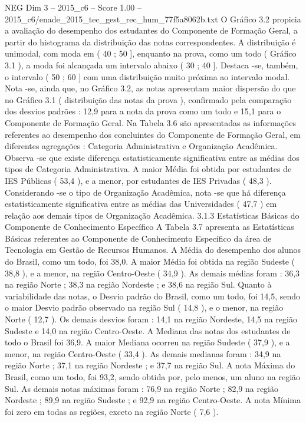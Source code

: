 \begin{textsample}{NEG Dim 3 – 2015\_c6 – Score 1.00 – 2015\_c6/enade\_2015\_tec\_gest\_rec\_hum\_77f5a8062b.txt}
O Gráfico 3.2 propicia a avaliação do desempenho dos estudantes do Componente de Formação Geral, a partir do histograma da distribuição das notas correspondentes.
A distribuição é unimodal, com moda em ( 40 ; 50 ], enquanto na prova, como um todo ( Gráfico 3.1 ), a moda foi alcançada um intervalo abaixo ( 30 ; 40 ].
Destaca -se, também, o intervalo ( 50 ; 60 ] com uma distribuição muito próxima ao intervalo modal.
Nota -se, ainda que, no Gráfico 3.2, as notas apresentam maior dispersão do que no Gráfico 3.1 ( distribuição das notas da prova ), confirmado pela comparação dos desvios padrões : 12,9 para a nota da prova como um todo e 15,1 para o Componente de Formação Geral.
Na Tabela 3.6 são apresentadas as informações referentes ao desempenho dos concluintes do Componente de Formação Geral, em diferentes agregações : Categoria Administrativa e Organização Acadêmica.
Observa -se que existe diferença estatisticamente significativa entre as médias dos tipos de Categoria Administrativa.
A maior Média foi obtida por estudantes de IES Públicas ( 53,4 ), e a menor, por estudantes de IES Privadas ( 48,3 ).
Considerando -se o tipo de Organização Acadêmica, nota -se que há diferença estatisticamente significativa entre as médias das Universidades ( 47,7 ) em relação aos demais tipos de Organização Acadêmica. 3.1.3 Estatísticas Básicas do Componente de Conhecimento Específico A Tabela 3.7 apresenta as Estatísticas Básicas referentes ao Componente de Conhecimento Específico da área de Tecnologia em Gestão de Recursos Humanos.
A Média do desempenho dos alunos do Brasil, como um todo, foi 38,0.
A maior Média foi obtida na região Sudeste ( 38,8 ), e a menor, na região Centro-Oeste ( 34,9 ).
As demais médias foram : 36,3 na região Norte ; 38,3 na região Nordeste ; e 38,6 na região Sul.
Quanto à variabilidade das notas, o Desvio padrão do Brasil, como um todo, foi 14,5, sendo o maior Desvio padrão observado na região Sul ( 14,8 ), e o menor, na região Norte ( 12,7 ).
Os demais desvios foram : 14,1 na região Nordeste, 14,5 na região Sudeste e 14,0 na região Centro-Oeste.
A Mediana das notas dos estudantes de todo o Brasil foi 36,9.
A maior Mediana ocorreu na região Sudeste ( 37,9 ), e a menor, na região Centro-Oeste ( 33,4 ).
As demais medianas foram : 34,9 na região Norte ; 37,1 na região Nordeste ; e 37,7 na região Sul.
A nota Máxima do Brasil, como um todo, foi 93,2, sendo obtida por, pelo menos, um aluno na região Sul.
As demais notas máximas foram : 76,9 na região Norte ; 82,9 na região Nordeste ; 89,9 na região Sudeste ; e 92,9 na região Centro-Oeste.
A nota Mínima foi zero em todas as regiões, exceto na região Norte ( 7,6 ).

\end{textsample}

